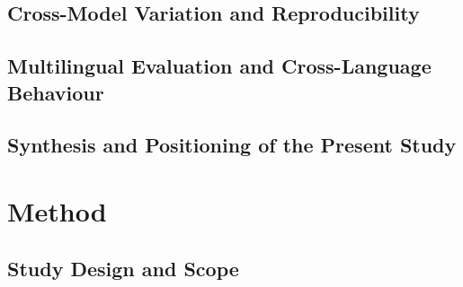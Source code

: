 \documentclass[logo,msc]{infthesis}           %
\begin{document}
\hypertarget{cross-model-variation-and-reproducibility}{%
\section{Cross-Model Variation and Reproducibility}\label{cross-model-variation-and-reproducibility}}

\hypertarget{multilingual-evaluation-and-cross-language-behaviour}{%
\section{Multilingual Evaluation and Cross-Language Behaviour}\label{multilingual-evaluation-and-cross-language-behaviour}}

\hypertarget{synthesis-and-positioning-of-the-present-study}{%
\section{Synthesis and Positioning of the Present Study}\label{synthesis-and-positioning-of-the-present-study}}

\hypertarget{method}{%
\chapter{Method}\label{method}}

\hypertarget{study-design-and-scope}{%
\section{Study Design and Scope}\label{study-design-and-scope}}
\end{document}
